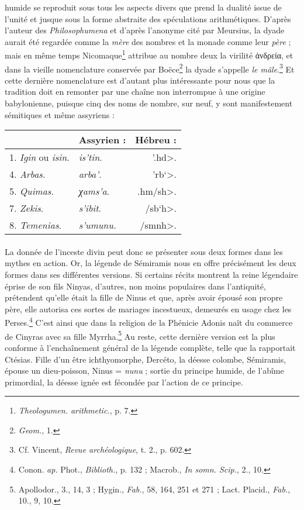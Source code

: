 \documentclass[a4paper, 11pt, oneside, landscape]{article}
\begin{document}
humide se reproduit sous tous les aspects divers que prend la dualité issue de l'unité et jusque sous la forme abstraite des spéculations arithmétiques. D'après l'auteur des \emph{Philosophumena} et d'après l'anonyme cité par Meursius, la dyade aurait été regardée comme la \emph{mère} des nombres et la monade comme leur \emph{père} ; mais en même temps Nicomaque\footnote{\emph{Theologumen. arithmetic.}, p. 7.} attribue au nombre deux la virilité ἀνδρεία, et dans la vieille nomenclature conservée par Boëce\footnote{\emph{Geom.}, 1.} la dyade s'appelle \emph{le mâle}.\footnote{Cf. Vincent, \emph{Revue archéologique}, t. 2., p. 602.} Et cette dernière nomenclature est d'autant plus intéressante pour nous que la tradition doit en remonter par une chaîne non interrompue à une origine babylonienne, puisque cinq des noms de nombre, sur neuf, y sont manifestement sémitiques et même assyriens :
\begin{table}[H]
    \centering
    \small
    \bfseries
    \begin{tabular}{l l r}
    \hline
        ~ & Assyrien : & Hébreu :   \\ \hline
        1. \emph{Igin} ou \emph{isin}. & \emph{is'tin}. & \<'.hd>. \\
        4. \emph{Arbas}. & \emph{arba'}. & \<'rb`>. \\ 
        5. \emph{Quimas}. & \emph{χams'a}. & \<.hm/sh>. \\ 
        7. \emph{Zekis}. & \emph{s'ibit}. & \</sb`h>. \\ 
        8. \emph{Temenias}. & \emph{s'umunu.} & \</smnh>. \\ 
    \end{tabular}
\end{table}
\paragraph{}
La donnée de l'inceste divin peut donc se présenter sous deux formes dans les mythes en action. Or, la légende de Sémiramis nous en offre précisément les deux formes dans ses différentes versions. Si certains récits montrent la reine légendaire éprise de son fils Ninyas, d'autres, non moins populaires dans l'antiquité, prétendent qu'elle était la fille de Ninus et que, après avoir épousé son propre père, elle autorisa ces sortes de mariages incestueux, demeurés en usage chez les Perses.\footnote{Conon. \emph{ap.} Phot., \emph{Biblioth.}, p. 132 ; Macrob., \emph{In somn. Scip.}, 2., 10.} C'est ainsi que dans la religion de la Phénicie Adonis naît du commerce de Cinyras avec sa fille Myrrha.\footnote{Apollodor., 3., 14, 3 ; Hygin., \emph{Fab.}, 58, 164, 251 et 271 ; Lact. Placid., \emph{Fab.}, 10., 9, 10.} Au reste, cette dernière version est la plus conforme à l'enchaînement général de la légende complète, telle que la rapportait Ctésias. Fille d'un être ichthyomorphe, Dercéto, la déesse colombe, Sémiramis, épouse un dieu-poisson, Ninus = \emph{nunu} ; sortie du principe humide, de l'abîme primordial, la déesse ignée est fécondée par l'action de ce principe.
\end{document}
